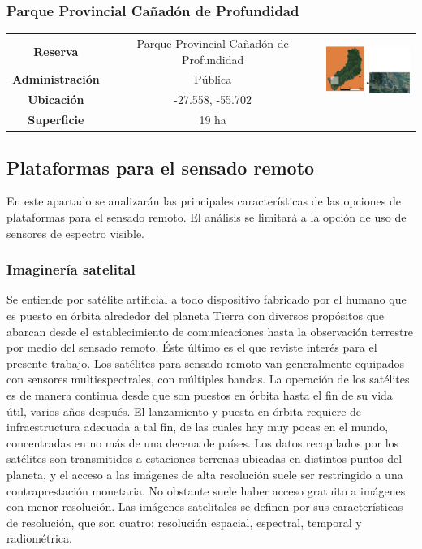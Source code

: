 \subsubsection{Parque Provincial Cañadón de Profundidad}
\begin{table}[H]
\centering
\begin{tabular}{|c|c|c|}
\hline
 \textbf{Reserva} & Parque Provincial Cañadón de Profundidad &   \multirow{ 3}{*}{\includegraphics[width=30mm]{Imagenes/Profundidad.png}}\\ 
\textbf{Administración} & Pública\\
        
        \textbf{Ubicación} & -27.558, -55.702 \\
         
        \textbf{Superficie} & 19 ha\\
\hline        
\end{tabular}

\label{Profundidad}
\end{table}
\subsection{Plataformas para el sensado remoto}
En este apartado se analizarán las principales características de las opciones de plataformas para el sensado remoto. El análisis se limitará a la opción de uso de sensores de espectro visible.
\subsubsection{Imaginería satelital}
Se entiende por satélite artificial a todo dispositivo fabricado por el humano que es puesto en órbita alrededor del planeta Tierra con diversos propósitos que abarcan desde el establecimiento de comunicaciones hasta la observación terrestre por medio del sensado remoto. Éste último es el que reviste interés para el presente trabajo. Los satélites para sensado remoto van generalmente equipados con sensores multiespectrales, con múltiples bandas. La operación de los satélites es de manera continua desde que son puestos en órbita hasta el fin de su vida útil, varios años después. El lanzamiento y puesta en órbita requiere de infraestructura adecuada a tal fin, de las cuales hay muy pocas en el mundo, concentradas en no más de una decena de países. Los datos recopilados por los satélites son transmitidos a estaciones terrenas ubicadas en distintos puntos del planeta, y el acceso a las imágenes de alta resolución suele ser restringido a una contraprestación monetaria. No obstante suele haber acceso gratuito a imágenes con menor resolución. Las imágenes satelitales se definen por sus características de resolución, que son cuatro: resolución espacial, espectral, temporal y radiométrica.

